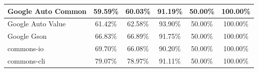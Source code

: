 \documentclass[../../main]{subfiles}
\begin{document}
\begin{table}[htb]
\begin{tabular}{|l|c|c|c|c|c|}
Google Auto Common            & 59.59\%                                                                                 & 60.03\%                                                                                     & 91.19\%                                                                              & 50.00\%                                                                               & 100.00\%                                                                             \\ \hline
Google Auto Value             & 61.42\%                                                                                 & 62.58\%                                                                                     & 93.90\%                                                                              & 50.00\%                                                                               & 100.00\%                                                                             \\ \hline
Google Gson                   & 66.83\%                                                                                 & 66.89\%                                                                                     & 91.75\%                                                                              & 50.00\%                                                                               & 100.00\%                                                                             \\ \hline
commons-io                    & 69.70\%                                                                                 & 66.08\%                                                                                     & 90.20\%                                                                              & 50.00\%                                                                               & 100.00\%                                                                             \\ \hline
commons-cli                   & 79.07\%                                                                                 & 78.97\%                                                                                     & 91.11\%                                                                              & 50.00\%                                                                               & 100.00\%                                                                             \\ \hline

\end{tabular}
\end{table}
\end{document}
